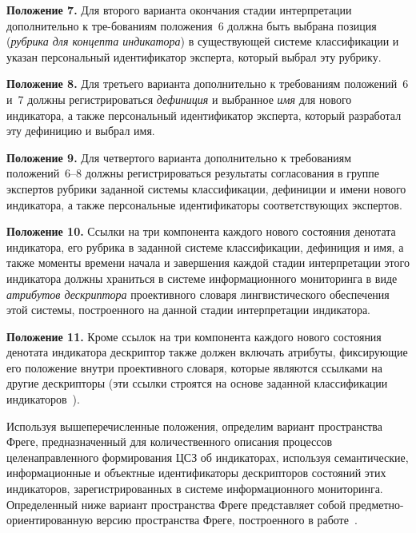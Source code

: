 \begin{multicols}{2}
   \textbf{Положение 7.} Для второго варианта окончания стадии интерпретации 
дополнительно к тре-\linebreak бованиям положения~6 должна быть выбрана\linebreak
позиция (\textit{рубрика 
для концепта индикатора}) в сущест\-ву\-ющей системе классификации и указан персональный 
идентификатор эксперта, который выбрал эту рубрику.
   
   \textbf{Положение 8.} Для третьего варианта дополнительно к требованиям положений~6 
и~7 должны регистрироваться \textit{дефиниция} и выбранное \textit{имя} для нового 
индикатора, а также персональный идентификатор эксперта, который разработал эту 
дефиницию и выбрал имя.
   
   \textbf{Положение 9.} Для четвертого варианта дополнительно к требованиям 
положений~6--8 должны регистрироваться результаты согласования в группе экспертов 
рубрики заданной системы классификации, дефиниции и имени нового индикатора, а также 
персональные идентификаторы соответствующих экспертов. 
   
   \textbf{Положение 10.} Ссылки на три компонента каж\-до\-го нового состояния денотата 
индикатора, его рубрика в заданной системе классификации, де\-финиция и имя, а также 
моменты времени начала и\linebreak
 завершения каждой стадии интерпретации этого индикатора 
должны храниться в системе информационного мониторинга в виде \textit{атрибутов 
дескриптора} проективного словаря лингвистического обеспечения этой системы, 
построенного на данной стадии интерпретации индикатора.
   
   \textbf{Положение 11.} Кроме ссылок на три компонента каждого нового состояния 
денотата индикатора дескриптор также должен включать атрибуты, фиксирующие его 
положение внутри проективного словаря, которые являются ссылками на другие 
дескрипторы (эти ссылки строятся на основе заданной классификации индикаторов~\cite{22-zat}).
   
   Используя вышеперечисленные положения, опре\-де\-лим вариант пространства Фреге, 
пред\-на\-зна\-чен\-ный для количественного описания процессов целенаправленного 
формирования ЦСЗ об индика\-торах, используя семантические, информационные и 
объектные идентификаторы дескрипторов состояний этих индикаторов, зарегистрированных 
в системе информационного мониторинга. Определенный ниже вариант пространства Фреге 
представляет собой предметно-ориентированную версию пространства Фреге, построенного 
в работе~\cite{17-zat}.
   

\end{multicols}
